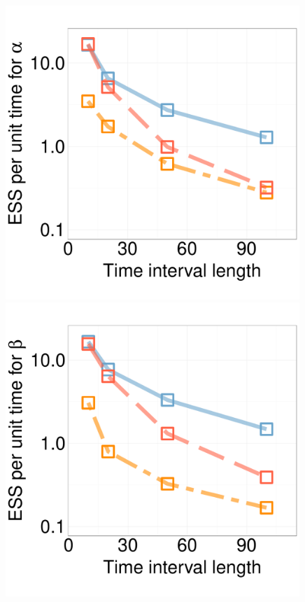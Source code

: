   \begin{figure}%
  \centering
  \begin{minipage}[hp]{0.24\linewidth}
  \centering
    \includegraphics [width=0.99\textwidth, angle=0]{figs/new_experiment_figs/ESS_vs_t_alpha_fixobservation.pdf}
    \end{minipage}
  \begin{minipage}[hp]{0.24\linewidth}
  \centering
    \includegraphics [width=0.99\textwidth, angle=0]{figs/new_experiment_figs/ESS_vs_t_beta_fixobservation.pdf}

\end{minipage}
\end{figure}
